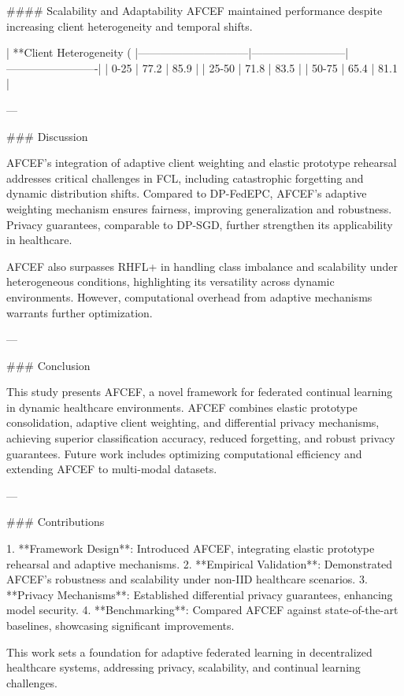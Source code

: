#### Scalability and Adaptability  
AFCEF maintained performance despite increasing client heterogeneity and temporal shifts.  

| **Client Heterogeneity (%
|------------------------------|--------------------------|-------------------------|
| 0-25                        | 77.2                    | 85.9                   |
| 25-50                       | 71.8                    | 83.5                   |
| 50-75                       | 65.4                    | 81.1                   |

---

### Discussion  

AFCEF’s integration of adaptive client weighting and elastic prototype rehearsal addresses critical challenges in FCL, including catastrophic forgetting and dynamic distribution shifts. Compared to DP-FedEPC, AFCEF’s adaptive weighting mechanism ensures fairness, improving generalization and robustness. Privacy guarantees, comparable to DP-SGD, further strengthen its applicability in healthcare.

AFCEF also surpasses RHFL+ in handling class imbalance and scalability under heterogeneous conditions, highlighting its versatility across dynamic environments. However, computational overhead from adaptive mechanisms warrants further optimization.

---

### Conclusion  

This study presents AFCEF, a novel framework for federated continual learning in dynamic healthcare environments. AFCEF combines elastic prototype consolidation, adaptive client weighting, and differential privacy mechanisms, achieving superior classification accuracy, reduced forgetting, and robust privacy guarantees. Future work includes optimizing computational efficiency and extending AFCEF to multi-modal datasets.

---

### Contributions  

1. **Framework Design**: Introduced AFCEF, integrating elastic prototype rehearsal and adaptive mechanisms.  
2. **Empirical Validation**: Demonstrated AFCEF’s robustness and scalability under non-IID healthcare scenarios.  
3. **Privacy Mechanisms**: Established differential privacy guarantees, enhancing model security.  
4. **Benchmarking**: Compared AFCEF against state-of-the-art baselines, showcasing significant improvements.

This work sets a foundation for adaptive federated learning in decentralized healthcare systems, addressing privacy, scalability, and continual learning challenges.